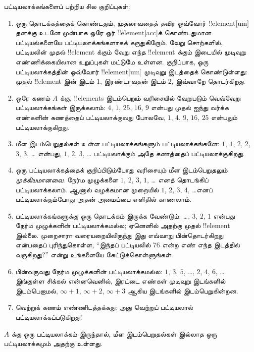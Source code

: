 \documentclass[../../../include/open-logic-section]{subfiles}
\begin{document}
\begin{explain}
பட்டியலாக்கங்களைப் பற்றிய சில குறிப்புகள்:
\begin{enumerate}
\item ஒரு தொடக்கத்தைக் கொண்டதும், முதலாவதைத் தவிர
  ஒவ்வோர் !!{element}[um] தனக்கு உடனே முன்பாக ஒரே ஓர்
  !!{element}[acc]க் கொண்டதுமான பட்டியல்களையே
  பட்டியலாக்கங்களாகக் கருதுகிறோம்.
  வேறு சொற்களில், பட்டியலின் முதல் !!{element} க்கும்
  வேறு எந்த !!{element} க்கும் இடையில் முடிவுறு எண்ணிக்கையிலான
  உறுப்புகள் மட்டுமே உள்ளன.
  குறிப்பாக, ஒரு பட்டியலாக்கத்தின் ஒவ்வோர் !!{element}[um]
  முடிவுறு இடத்தைக் கொண்டுள்ளது: முதல் !!{element} இன் இடம் $1$,
  இரண்டாவதன் இடம் $2$, இவ்வாறே தொடர்கிறது.
\item ஒரே கணம் $A$ க்கு, !!{element}s இடம்பெறும் வரிசையில்
  வேறுபடும் வெவ்வேறு பட்டியலாக்கங்கள் இருக்கலாம்:
  $4$, $1$, $25$, $16$, $9$ என்பது முதல் ஐந்து வர்க்க எண்களின்
  கணத்தைப் பட்டியலாக்குவது போலவே,
  $1$, $4$, $9$, $16$, $25$ என்பதும் பட்டியலாக்குகிறது.
\item மீள இடம்பெறுதல்கள் உள்ள பட்டியலாக்கங்களும் பட்டியலாக்கங்களே:
  $1$, $1$, $2$, $2$, $3$, $3$, \dots{} என்பது,
  $1$, $2$, $3$, \dots{} பட்டியலாக்கும் அதே கணத்தைப் பட்டியலாக்குகிறது.
\item ஒரு பட்டியலாக்கத்தைக் குறிப்பிடும்போது வரிசையும்
  மீள இடம்பெறுதலும் \emph{முக்கியமானவை}.
  நேர்ம முழுக்களை $1$, $2$, $3$, $1$, \dots{} எனத் தொடங்கிப்
  பட்டியலாக்கலாம். ஆனால் வழக்கமான முறையில்
  $1$, $2$, $3$, $4$, \dots எனப் பட்டியலாக்கும்போது
  அதன் அமைப்பை எளிதில் காணலாம்.
\item பட்டியலாக்கங்களுக்கு ஒரு தொடக்கம் இருக்க வேண்டும்:
  \dots, $3$, $2$, $1$ என்பது நேர்ம முழுக்களின் பட்டியலாக்கமல்ல;
  ஏனெனில் அதற்கு முதல் !!{element} இல்லை.
  முறைசாரா வரையறையிலிருந்து இது எவ்வாறு பின்தொடர்கிறது
  என்பதைப் புரிந்துகொள்ள, “இந்தப் பட்டியலில் 76 என்ற எண்
  எந்த இடத்தில் வருகிறது?” என்று உங்களையே கேட்டுக்கொள்ளுங்கள்.
\item பின்வருவது நேர்ம முழுக்களின் பட்டியலாக்கமல்ல:
  $1$, $3$, $5$, \dots, $2$, $4$, $6$, \dots\@
  இங்குள்ள சிக்கல் என்னவெனில், இரட்டை எண்கள் முடிவுறு இடங்களில்
  இடம்பெறாமல், $\infty + 1$, $\infty + 2$, $\infty +
  3$ ஆகிய இடங்களில் இடம்பெறுகின்றன.
\item வெற்றுக் கணம் எண்ணிடத்தக்கது:
  அது வெற்றுப் பட்டியலால் பட்டியலாக்கப்படுகிறது!{}
\end{enumerate}
\end{explain}

\begin{prop}
$A$ க்கு ஒரு பட்டியலாக்கம் இருந்தால்,
மீள இடம்பெறுதல்கள் இல்லாத ஒரு பட்டியலாக்கமும் அதற்கு உள்ளது.
\end{prop}
\end{document}
